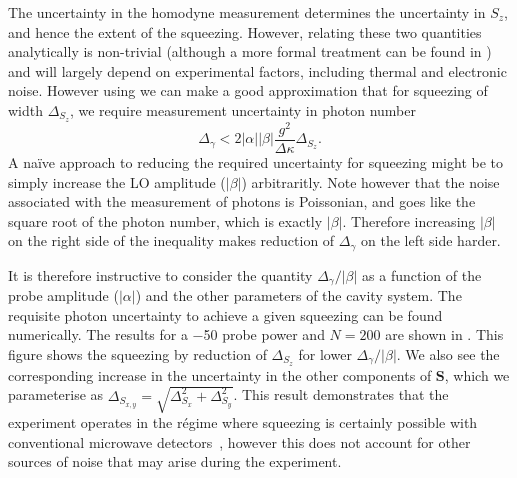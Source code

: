 The uncertainty in the homodyne measurement determines the uncertainty in
$S_z$, and hence the extent of the squeezing. However, relating these two
quantities analytically is non-trivial (although a more formal treatment can be
found in ) and will largely depend on experimental
factors, including thermal and electronic noise. However using
 we can make a good approximation that for
squeezing of width $\Delta_{S_z}$, we require measurement uncertainty in photon
number
%
\begin{equation}
  \Delta_\gamma < 2|\alpha||\beta| \frac{g^2}{\Delta\kappa}\Delta_{S_z}.
\end{equation}
%
A na\"ive approach to reducing the required uncertainty for squeezing might be
to simply increase the LO amplitude ($|\beta|$) arbitraritly. Note however that
the noise associated with the measurement of photons is Poissonian, and goes
like the square root of the photon number, which is exactly $|\beta|$.
Therefore increasing $|\beta|$ on the right side of the inequality makes
reduction of $\Delta_\gamma$ on the left side harder.


It is therefore instructive to consider the quantity $\Delta_\gamma/|\beta|$ as
a function of the probe amplitude ($|\alpha|$) and the other parameters of the
cavity system. The requisite photon uncertainty to achieve a given squeezing
can be found numerically. The results for a \SI{-50}{\dbm} probe power and
$N=200$ are shown in . This figure shows
the squeezing by reduction of $\Delta_{S_z}$ for lower $\Delta_\gamma/|\beta|$.
We also see the corresponding increase in the uncertainty in the other
components of $\mathbf{S}$, which we parameterise as $\Delta_{S_{x,y}} =
\sqrt{\Delta_{S_x}^2 + \Delta_{S_y}^2}$. This result demonstrates that the
experiment operates in the r\'egime where squeezing is certainly possible with
conventional microwave detectors~\cite{Dicke1946m, PhysRevD.88.035020}, however
this does not account for other sources of noise that may arise during the
experiment.

